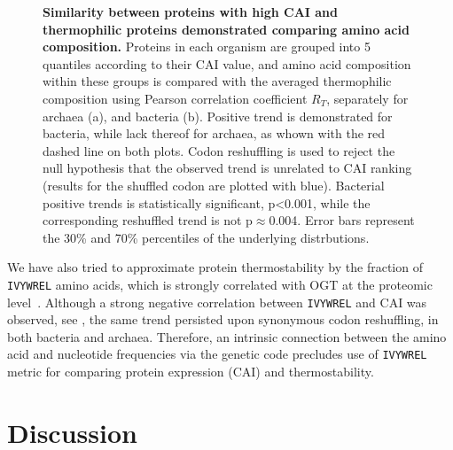 \documentclass[10pt,letterpaper]{article}
\begin{document}
\begin{figure}[h!]
\caption{
{\bf Similarity between proteins with high CAI and thermophilic proteins demonstrated comparing amino acid composition.}
Proteins in each organism are grouped into 5 quantiles according to their CAI value, and amino acid composition within these groups is compared with the averaged thermophilic composition using Pearson correlation coefficient $R_T$, separately for archaea (a), and bacteria (b). Positive trend is demonstrated for bacteria, while lack thereof for archaea, as whown with the red dashed line on both plots. Codon reshuffling is used to reject the null hypothesis that the observed trend is unrelated to CAI ranking (results for the shuffled codon are plotted with blue). Bacterial positive trends is statistically significant, p\textless0.001, while the corresponding reshuffled trend is not p$\approx$0.004. Error bars represent the 30\% and 70\% percentiles of the underlying distrbutions.
}
\label{fig:fig7}
\end{figure}

We have also tried to approximate protein thermostability by the fraction of \texttt{IVYWREL} amino acids, which is strongly correlated with OGT at the proteomic level~\cite{Zeldovich2007Protein}. Although a strong negative correlation between \texttt{IVYWREL} and CAI was observed, see , the same trend persisted upon synonymous codon reshuffling, in both bacteria and archaea. Therefore, an intrinsic connection between the amino acid and nucleotide frequencies via the genetic code precludes use of \texttt{IVYWREL} metric for comparing protein expression (CAI) and thermostability.

\section*{Discussion}

\end{document}
